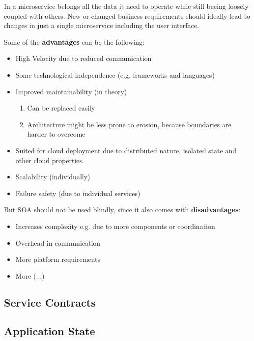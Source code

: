 \documentclass[../Main.tex]{subfiles}
\begin{document}
In a microservice belongs all the data it need to operate while still beeing loosely coupled with others.
New or changed business requirements should ideally lead to changes in just a single microservice including the user interface.

Some of the \textbf{advantages} can be the following:
\begin{multicols}{2}
    \begin{itemize}
        \item High Velocity due to reduced communication
        \item Some technological independence (e.g. frameworks and languages)
        \item Improved maintainability (in theory)
        \begin{enumerate}
            \item Can be replaced easily
            \item Architecture might be less prone to erosion, because boundaries are harder to overcome
        \end{enumerate}
        \item Suited for cloud deployment due to distributed nature, isolated state and other cloud properties.
        \item Scalability (individually)
        \item Failure safety (due to individual services)
    \end{itemize}
    \columnbreak
    But SOA should not be used blindly, since it also comes with \textbf{disadvantages}:
    \begin{itemize}
        \item Increases complexity e.g. due to more components or coordination
        \item Overhead in communication
        \item More platform requirements
        \item More (...)
    \end{itemize}
\end{multicols}

\subsection{Service Contracts}

\subsection{Application State}
\end{document}
